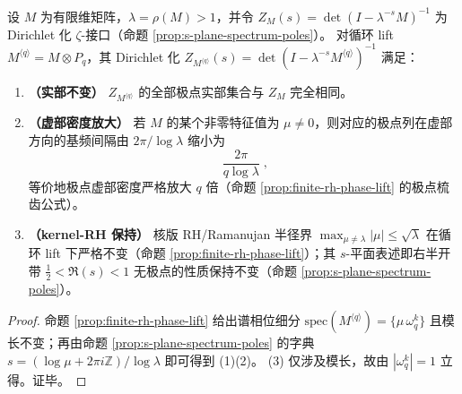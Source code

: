 \begin{corollary}\label{cor:zeta-cyclic-lift-dirichlet-comb}
设 \(M\) 为有限维矩阵，\(\lambda=\rho(M)>1\)，并令
\(
Z_M(s)=\det(I-\lambda^{-s}M)^{-1}
\)
为 Dirichlet 化 \(\zeta\)-接口（命题 \ref{prop:s-plane-spectrum-poles}）。
对循环 lift \(M^{\langle q\rangle}=M\otimes P_q\)，其 Dirichlet 化
\(
Z_{M^{\langle q\rangle}}(s)=\det(I-\lambda^{-s}M^{\langle q\rangle})^{-1}
\)
满足：
\begin{enumerate}
  \item \textbf{（实部不变）} \(Z_{M^{\langle q\rangle}}\) 的全部极点实部集合与 \(Z_M\) 完全相同。
  \item \textbf{（虚部密度放大）} 若 \(M\) 的某个非零特征值为 \(\mu\neq 0\)，则对应的极点列在虚部方向的基频间隔由 \(2\pi/\log\lambda\) 缩小为
  \[
  \boxed{\;
  \frac{2\pi}{q\log\lambda}\; },
  \]
  等价地极点虚部密度严格放大 \(q\) 倍（命题 \ref{prop:finite-rh-phase-lift} 的极点梳齿公式）。
  \item \textbf{（kernel-RH 保持）} 核版 RH/Ramanujan 半径界
  \(
  \max_{\mu\neq\lambda}|\mu|\le \sqrt{\lambda}
  \)
  在循环 lift 下严格不变（命题 \ref{prop:finite-rh-phase-lift}）；其 \(s\)-平面表述即右半开带 \(\tfrac12<\Re(s)<1\) 无极点的性质保持不变（命题 \ref{prop:s-plane-spectrum-poles}）。
\end{enumerate}
\end{corollary}
\begin{proof}
命题 \ref{prop:finite-rh-phase-lift} 给出谱相位细分
\(
\mathrm{spec}(M^{\langle q\rangle})=\{\mu\,\omega_q^k\}
\)
且模长不变；再由命题 \ref{prop:s-plane-spectrum-poles} 的字典
\(
s=(\log\mu+2\pi i\mathbb{Z})/\log\lambda
\)
即可得到 (1)(2)。
(3) 仅涉及模长，故由 \(|\omega_q^k|=1\) 立得。证毕。
\end{proof}

